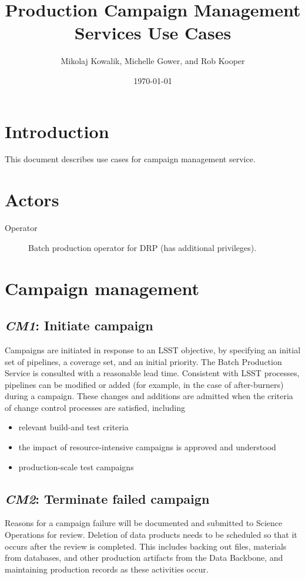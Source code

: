 \documentclass[DM,lsstdraft,toc]{lsstdoc}
\title{Production Campaign Management Services Use Cases}
\author{Mikolaj Kowalik, Michelle Gower, and Rob Kooper}
\date{\today}
\newcommand{\usecase}[2]{\subsection{\emph{#1}: #2}\label{use:#1}}
\begin{document}
\maketitle

\section{Introduction}

This document describes use cases for campaign management service.

\section{Actors}

\begin{description}
  \item[Operator]
    Batch production operator for DRP (has additional privileges).
\end{description}

\section{Campaign management}

\usecase{CM1}{Initiate campaign}
Campaigns are initiated in response to an LSST objective, by specifying an
initial set of pipelines, a coverage set, and an initial priority.  The Batch
Production Service is consulted with a reasonable lead time.  Consistent with
LSST processes, pipelines can be modified or added (for example, in the case of
after-burners) during a campaign. These changes and additions are admitted when
the criteria of change control processes are satisfied, including
\begin{itemize}
  \item
    relevant build-and test criteria
  \item
    the impact of resource-intensive campaigns is approved and understood
  \item
   production-scale test campaigns
\end{itemize}

\usecase{CM2}{Terminate failed campaign}
Reasons for a campaign failure will be documented and submitted to Science
Operations for review. Deletion of data products needs to be scheduled so that
it occurs after the review is completed. This includes backing out files,
materials from databases, and other production artifacts from the Data
Backbone, and maintaining production records as these activities occur.
\end{document}
